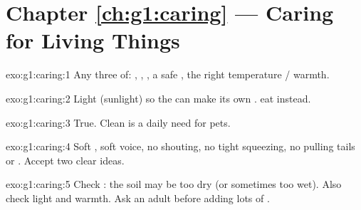 \section*{Chapter \ref{ch:g1:caring} --- Caring for Living Things}

\begin{solution}{exo:g1:caring:1}
Any three of: , , , a safe , the right
temperature / warmth.
\end{solution}

\begin{solution}{exo:g1:caring:2}
Light (sunlight) so the  can make its own .  eat
 instead.
\end{solution}

\begin{solution}{exo:g1:caring:3}
True. Clean  is a daily need for pets.
\end{solution}

\begin{solution}{exo:g1:caring:4}
Soft , soft voice, no shouting, no tight squeezing, no
pulling tails or . Accept two clear ideas.
\end{solution}

\begin{solution}{exo:g1:caring:5}
Check : the soil may be too dry (or sometimes too wet). Also
check light and warmth. Ask an adult before adding lots of .
\end{solution}

